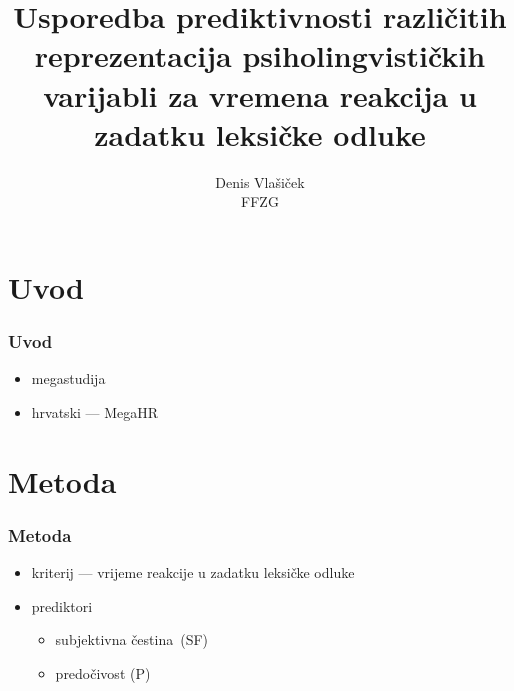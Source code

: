 \documentclass[aspectratio=169]{beamer}
\title[]{Usporedba prediktivnosti različitih reprezentacija psiholingvističkih
    varijabli za vremena reakcija u zadatku leksičke odluke}
\author[]{\tiny Denis Vlašiček\\[1em]
    FFZG}
\date{}
\newcommand{\tinycitep}[1]{%
    \bgroup
    \scriptsize
    \citep{#1}%
    \egroup}
\begin{document}
\begin{frame}
    \titlepage

    \centering
\end{frame}

\section{Uvod}

\begingroup

    \begin{frame}
        \frametitle{Uvod}

        \begin{itemize}
            \setlength{\itemsep}{2em}

            \item megastudija

            \item hrvatski --- MegaHR
                \tinycitep{petistanticPsiholingvistickeMjereIspitivanja2018}

        \end{itemize}
        
    \end{frame}
\endgroup

\section{Metoda}

\begingroup

    \begin{frame}
        \frametitle{Metoda}

        \begin{itemize}
            \setlength{\itemsep}{2em}

            \item kriterij --- vrijeme reakcije u zadatku leksičke odluke

            \pause

            \item prediktori

                \begin{itemize}

                    \item subjektivna čestina (SF)

                    \pause

                    \item predočivost (P)

                \end{itemize}
        \end{itemize}
    \end{frame}
\endgroup
\end{document}
